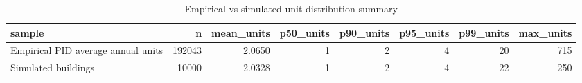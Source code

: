 \begin{table}

\caption{Empirical vs simulated unit distribution summary}
\centering
\begin{tabular}[t]{lrrrrrrr}
\toprule
sample & n & mean\_units & p50\_units & p90\_units & p95\_units & p99\_units & max\_units\\
\midrule
Empirical PID average annual units & 192043 & 2.0650 & 1 & 2 & 4 & 20 & 715\\
Simulated buildings & 10000 & 2.0328 & 1 & 2 & 4 & 22 & 250\\
\bottomrule
\end{tabular}
\end{table}
